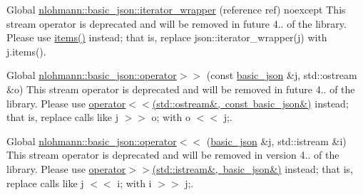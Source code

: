 
\begin{DoxyRefList}
\item[Global \mbox{\hyperlink{classnlohmann_1_1basic__json_a0a8051760196ac813fd5eb3c8d5a2976}{nlohmann\+::basic\+\_\+json\+::iterator\+\_\+wrapper}} (reference ref) noexcept]\label{deprecated__deprecated000001}%
%
This stream operator is deprecated and will be removed in future 4.. of the library. Please use \mbox{\hyperlink{classnlohmann_1_1basic__json_a5961446010dfc494e0c247b4e9026977}{items()}} instead; that is, replace {\ttfamily json\+::iterator\+\_\+wrapper(j)} with {\ttfamily j.\+items()}.  
\item[Global \mbox{\hyperlink{classnlohmann_1_1basic__json_a34d6a60dd99e9f33b8273a1c8db5669b}{nlohmann\+::basic\+\_\+json\+::operator$>$$>$}} (const \mbox{\hyperlink{classnlohmann_1_1basic__json}{basic\+\_\+json}} \&j, std\+::ostream \&o)]\label{deprecated__deprecated000002}%
%
This stream operator is deprecated and will be removed in future 4.. of the library. Please use \mbox{\hyperlink{classnlohmann_1_1basic__json_a5e34c5435e557d0bf666bd7311211405}{operator$<$$<$(std\+::ostream\&, const basic\+\_\+json\&)}} instead; that is, replace calls like {\ttfamily j $>$$>$ o;} with {\ttfamily o $<$$<$ j;}.  
\item[Global \mbox{\hyperlink{classnlohmann_1_1basic__json_a60ca396028b8d9714c6e10efbf475af6}{nlohmann\+::basic\+\_\+json\+::operator$<$$<$}} (\mbox{\hyperlink{classnlohmann_1_1basic__json}{basic\+\_\+json}} \&j, std\+::istream \&i)]\label{deprecated__deprecated000003}%
%
This stream operator is deprecated and will be removed in version 4.. of the library. Please use \mbox{\hyperlink{classnlohmann_1_1basic__json_aaf363408931d76472ded14017e59c9e8}{operator$>$$>$(std\+::istream\&, basic\+\_\+json\&)}} instead; that is, replace calls like {\ttfamily j $<$$<$ i;} with {\ttfamily i $>$$>$ j;}. 
\end{DoxyRefList}